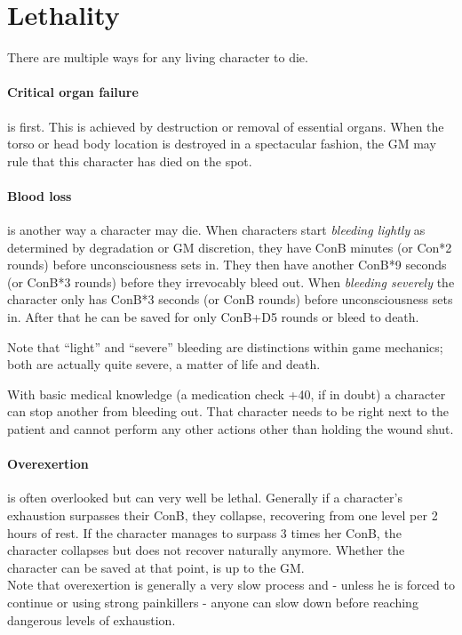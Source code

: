 \documentclass[12pt,a4paper,openany,dvipsnames]{book}
\begin{document}
	\section{Lethality}
	\label{sec:lethality}
	There are multiple ways for any living character to die.
	\paragraph{Critical organ failure}is first. This is achieved by destruction or removal of essential organs. When the torso or head body location is destroyed in a spectacular fashion, the GM may rule that this character has died on the spot.
	\paragraph{Blood loss}is another way a character may die. When characters start \emph{bleeding lightly} as determined by degradation or GM discretion, they have ConB minutes (or Con*2 rounds) before unconsciousness sets in.
	They then have another ConB*9 seconds (or ConB*3 rounds) before they irrevocably bleed out. When \emph{bleeding severely} the character only has ConB*3 seconds (or ConB rounds) before unconsciousness sets in.
	After that he can be saved for only ConB+D5 rounds or bleed to death.
	\begin{exampleblock}
		Note that “light” and “severe” bleeding are distinctions within game mechanics;
		both are actually quite severe, a matter of life and death.
	\end{exampleblock}
	With basic medical knowledge (a medication check +40, if in doubt) a character can stop another from bleeding out. That character needs to be right next to the patient and cannot perform any other actions other than holding the wound shut.
	\paragraph{Overexertion} is often overlooked but can very well be lethal. Generally if a character’s exhaustion surpasses their ConB, they collapse, recovering from one level per 2 hours of rest. If the character manages to surpass 3 times her ConB, the character collapses but does not recover naturally anymore. Whether the character can be saved at that point, is up to the GM.\\
	Note that overexertion is generally a very slow process
		and - unless he is forced to continue or using strong painkillers -
		anyone can slow down before reaching dangerous levels of exhaustion.
\end{document}

